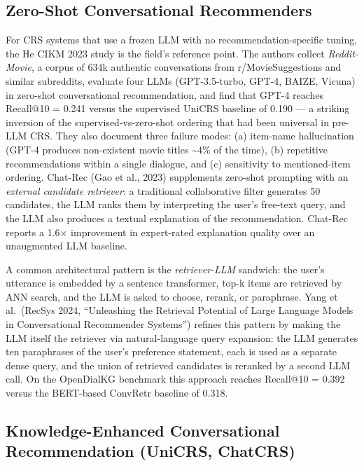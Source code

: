 \subsection{Zero-Shot Conversational Recommenders}\label{zero-shot-conversational-recommenders}

For CRS systems that use a frozen LLM with no recommendation-specific tuning, the He CIKM 2023 study is the field's reference point. The authors collect \emph{Reddit-Movie}, a corpus of 634k authentic conversations from r/MovieSuggestions and similar subreddits, evaluate four LLMs (GPT-3.5-turbo, GPT-4, BAIZE, Vicuna) in zero-shot conversational recommendation, and find that GPT-4 reaches Recall@10 = 0.241 versus the supervised UniCRS baseline of 0.190 --- a striking inversion of the supervised-vs-zero-shot ordering that had been universal in pre-LLM CRS. They also document three failure modes: (a) item-name hallucination (GPT-4 produces non-existent movie titles \textasciitilde4\% of the time), (b) repetitive recommendations within a single dialogue, and (c) sensitivity to mentioned-item ordering. Chat-Rec (Gao et al., 2023) supplements zero-shot prompting with an \emph{external candidate retriever}: a traditional collaborative filter generates 50 candidates, the LLM ranks them by interpreting the user's free-text query, and the LLM also produces a textual explanation of the recommendation. Chat-Rec reports a 1.6× improvement in expert-rated explanation quality over an unaugmented LLM baseline.

A common architectural pattern is the \emph{retriever-LLM} sandwich: the user's utterance is embedded by a sentence transformer, top-k items are retrieved by ANN search, and the LLM is asked to choose, rerank, or paraphrase. Yang et al.~(RecSys 2024, ``Unleashing the Retrieval Potential of Large Language Models in Conversational Recommender Systems'') refines this pattern by making the LLM itself the retriever via natural-language query expansion: the LLM generates ten paraphrases of the user's preference statement, each is used as a separate dense query, and the union of retrieved candidates is reranked by a second LLM call. On the OpenDialKG benchmark this approach reaches Recall@10 = 0.392 versus the BERT-based ConvRetr baseline of 0.318.

\subsection{Knowledge-Enhanced Conversational Recommendation (UniCRS, ChatCRS)}\label{knowledge-enhanced-conversational-recommendation-unicrs-chatcrs}

